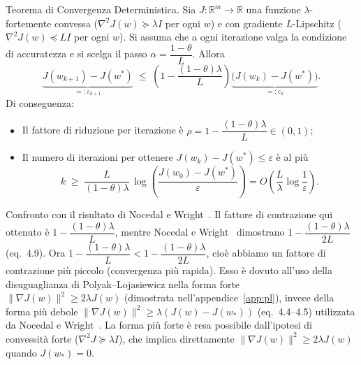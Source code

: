 \documentclass[italian, a4paper, twoside, binding=6mm]{sapthesis}
\begin{document}
\newpage
\begin{thmbox}
  Teorema di Convergenza Deterministica.
  Sia $J: \mathbb{R}^m \to \mathbb{R}$ una funzione $\lambda$-fortemente convessa ($\nabla^2 J(w) \succeq \lambda I$ per ogni $w$) e con gradiente $L$-Lipschitz ($\nabla^2 J(w) \preceq LI$ per ogni $w$).
  Si assuma che a ogni iterazione valga la condizione di accuratezza e si scelga il passo 
  $\alpha = \dfrac{1-\theta}{L}$. Allora
  \[
  \underbrace{J(w_{k+1}) - J(w^*)}_{=: \varepsilon_{k+1}} \;\leq\; 
  \left(1 - \frac{(1-\theta)\lambda}{L}\right) \underbrace{\bigl(J(w_k) - J(w^*)\bigr)}_{=: \varepsilon_k}.
  \]
  Di conseguenza:
  \begin{itemize}
    \item Il fattore di riduzione per iterazione \`e $\rho = 1 - \dfrac{(1-\theta)\lambda}{L} \in (0,1)$;
    \item Il numero di iterazioni per ottenere $J(w_k) - J(w^*) \le \varepsilon$ \`e al pi\`u
    \[
    k \;\ge\; \frac{L}{(1-\theta)\lambda}\,\log\!\left(\frac{J(w_0)-J(w^*)}{\varepsilon}\right)
    = O\!\left(\frac{L}{\lambda}\log\frac{1}{\varepsilon}\right).
    \]
  \end{itemize}
\end{thmbox}

\begin{notebox}
  Confronto con il risultato di Nocedal e Wright~\cite{nocedal2006}.
  Il fattore di contrazione qui ottenuto è $1 - \dfrac{(1-\theta)\lambda}{L}$, mentre Nocedal e Wright~\cite{nocedal2006} dimostrano $1 - \dfrac{(1-\theta)\lambda}{2L}$ (eq.~4.9). Ora $1 - \dfrac{(1-\theta)\lambda}{L} < 1 - \dfrac{(1-\theta)\lambda}{2L}$, cioè abbiamo un fattore di contrazione più piccolo (convergenza più rapida). Esso è dovuto all'uso della disuguaglianza di Polyak--Lojasiewicz nella forma forte $\|\nabla J(w)\|^2 \ge 2\lambda J(w)$ (dimostrata nell'appendice~\ref{app:pl}), invece della forma più debole $\|\nabla J(w)\|^2 \ge \lambda(J(w)-J(w_*))$ (eq.~4.4--4.5) utilizzata da Nocedal e Wright~\cite{nocedal2006}. La forma più forte è resa possibile dall'ipotesi di convessità forte ($\nabla^2 J \succeq \lambda I$), che implica direttamente $\|\nabla J(w)\|^2 \ge 2\lambda J(w)$ quando $J(w_*)=0$.
\end{notebox}
\end{document}
